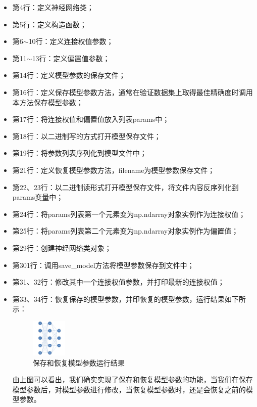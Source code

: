 \documentclass[UTF8]{article}
\begin{document}
\begin{itemize}
\item 第4行：定义神经网络类；
\item 第5行：定义构造函数；
\item 第6$\sim$10行：定义连接权值参数；
\item 第11$\sim$13行：定义偏置值参数；
\item 第14行：定义模型参数的保存文件；
\item 第16行：定义保存模型参数方法，通常在验证数据集上取得最佳精确度时调用本方法保存模型参数；
\item 第17行：将连接权值和偏置值放入列表params中；
\item 第18行：以二进制写的方式打开模型保存文件；
\item 第19行：将参数列表序列化到模型文件中；
\item 第21行：定义恢复模型参数方法，filename为模型参数保存文件；
\item 第22、23行：以二进制读形式打开模型保存文件，将文件内容反序列化到params变量中；
\item 第24行：将params列表第一个元素变为np.ndarray对象实例作为连接权值；
\item 第25行：将params列表第二个元素变为np.ndarray对象实例作为偏置值；
\item 第29行：创建神经网络类对象；
\item 第301行：调用save\_model方法将模型参数保存到文件中；
\item 第31、32行：修改其中一个连接权值参数，并打印最新的连接权值；
\item 第33、34行：恢复保存的模型参数，并印恢复的模型参数，运行结果如下所示：
\begin{figure}[H]
	\caption{保存和恢复模型参数运行结果}
	\label{f000063}
	\centering
	\includegraphics[height=1.8cm]{images/f000063}
\end{figure}
由上图可以看出，我们确实实现了保存和恢复模型参数的功能，当我们在保存模型参数后，对模型参数进行修改，当恢复模型参数时，还是会恢复之前的模型参数。
\end{itemize}
\end{document}

